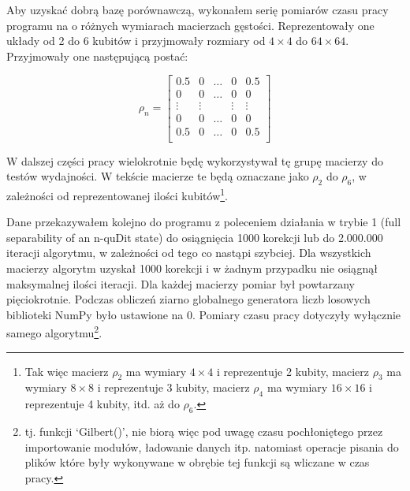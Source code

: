 \documentclass[10pt, a4paper]{article}
\begin{document}
\begin{sloppypar}
    Aby uzyskać dobrą bazę porównawczą, wykonałem serię pomiarów czasu pracy programu na
    o różnych wymiarach macierzach gęstości. Reprezentowały one układy od 2 do 6 kubitów
    i przyjmowały rozmiary od $4\times4$ do $64\times64$. Przyjmowały one następującą
    postać:

    \[
      \rho_{n}=
      \begin{bmatrix}
        0.5    & 0      & \hdots & 0      & 0.5    \\
        0      & 0      & \hdots & 0      & 0      \\
        \vdots & \vdots &        & \vdots & \vdots \\
        0      & 0      & \hdots & 0      & 0      \\
        0.5    & 0      & \hdots & 0      & 0.5    \\
      \end{bmatrix}
    \]

    W dalszej części pracy wielokrotnie będę wykorzystywał tę grupę macierzy do testów wydajności.
    W tekście macierze te będą oznaczane jako $\rho_{2}$ do $\rho_{6}$, w zależności od reprezentowanej
    ilości kubitów\footnote{Tak więc macierz $\rho_{2}$ ma wymiary $4\times4$ i
    reprezentuje 2 kubity, macierz $\rho_{3}$ ma wymiary $8\times8$ i reprezentuje 3 kubity,
    macierz $\rho_{4}$ ma wymiary $16\times16$ i reprezentuje 4 kubity, itd. aż do
    $\rho_{6}$.}.

    Dane przekazywałem kolejno do programu z poleceniem działania w trybie 1 (full separability
    of an n-quDit state) do osiągnięcia 1000 korekcji lub do 2.000.000 iteracji algorytmu,
    w zależności od tego co nastąpi szybciej. Dla wszystkich macierzy algorytm uzyskał 1000
    korekcji i w żadnym przypadku nie osiągnął maksymalnej ilości iteracji. Dla każdej
    macierzy pomiar był powtarzany pięciokrotnie. Podczas obliczeń ziarno globalnego generatora
    liczb losowych biblioteki NumPy było ustawione na 0. Pomiary czasu pracy dotyczyły wyłącznie
    samego algorytmu\footnote{tj. funkcji `Gilbert()', nie biorą więc pod uwagę czasu
    pochłoniętego przez importowanie modułów, ładowanie danych itp. natomiast operacje
    pisania do plików które były wykonywane w obrębie tej funkcji są wliczane w czas
    pracy.}.


\end{sloppypar}
\end{document}
